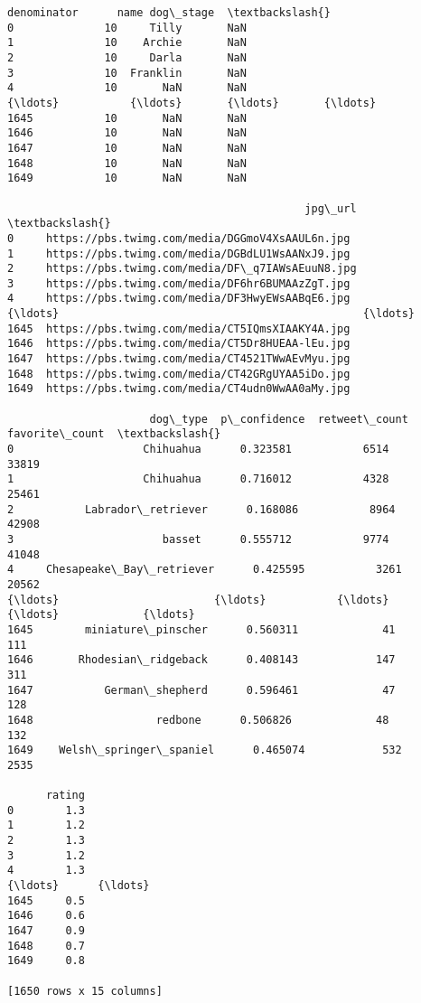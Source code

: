 \documentclass[11pt]{article}
\begin{document}
\begin{tcolorbox}[breakable, size=fbox, boxrule=.5pt, pad at break*=1mm, opacityfill=0]
\begin{Verbatim}[commandchars=\\\{\}]
      denominator      name dog\_stage  \textbackslash{}
0              10     Tilly       NaN
1              10    Archie       NaN
2              10     Darla       NaN
3              10  Franklin       NaN
4              10       NaN       NaN
{\ldots}           {\ldots}       {\ldots}       {\ldots}
1645           10       NaN       NaN
1646           10       NaN       NaN
1647           10       NaN       NaN
1648           10       NaN       NaN
1649           10       NaN       NaN

                                              jpg\_url  \textbackslash{}
0     https://pbs.twimg.com/media/DGGmoV4XsAAUL6n.jpg
1     https://pbs.twimg.com/media/DGBdLU1WsAANxJ9.jpg
2     https://pbs.twimg.com/media/DF\_q7IAWsAEuuN8.jpg
3     https://pbs.twimg.com/media/DF6hr6BUMAAzZgT.jpg
4     https://pbs.twimg.com/media/DF3HwyEWsAABqE6.jpg
{\ldots}                                               {\ldots}
1645  https://pbs.twimg.com/media/CT5IQmsXIAAKY4A.jpg
1646  https://pbs.twimg.com/media/CT5Dr8HUEAA-lEu.jpg
1647  https://pbs.twimg.com/media/CT4521TWwAEvMyu.jpg
1648  https://pbs.twimg.com/media/CT42GRgUYAA5iDo.jpg
1649  https://pbs.twimg.com/media/CT4udn0WwAA0aMy.jpg

                      dog\_type  p\_confidence  retweet\_count  favorite\_count  \textbackslash{}
0                    Chihuahua      0.323581           6514           33819
1                    Chihuahua      0.716012           4328           25461
2           Labrador\_retriever      0.168086           8964           42908
3                       basset      0.555712           9774           41048
4     Chesapeake\_Bay\_retriever      0.425595           3261           20562
{\ldots}                        {\ldots}           {\ldots}            {\ldots}             {\ldots}
1645        miniature\_pinscher      0.560311             41             111
1646       Rhodesian\_ridgeback      0.408143            147             311
1647           German\_shepherd      0.596461             47             128
1648                   redbone      0.506826             48             132
1649    Welsh\_springer\_spaniel      0.465074            532            2535

      rating
0        1.3
1        1.2
2        1.3
3        1.2
4        1.3
{\ldots}      {\ldots}
1645     0.5
1646     0.6
1647     0.9
1648     0.7
1649     0.8

[1650 rows x 15 columns]
\end{Verbatim}
\end{tcolorbox}
        
\end{document}
